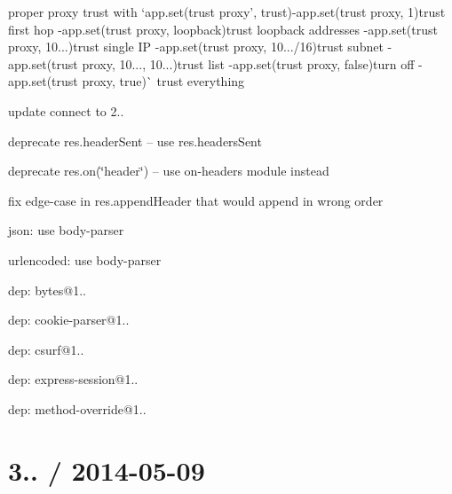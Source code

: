 {\ttfamily 
\begin{DoxyItemize}
\item proper proxy trust with `app.\+set(\textquotesingle{}trust proxy', trust){\ttfamily  -\/}app.\+set(\textquotesingle{}trust proxy\textquotesingle{}, 1){\ttfamily trust first hop -\/}app.\+set(\textquotesingle{}trust proxy\textquotesingle{}, \textquotesingle{}loopback\textquotesingle{}){\ttfamily trust loopback addresses -\/}app.\+set(\textquotesingle{}trust proxy\textquotesingle{}, \textquotesingle{}10...\textquotesingle{}){\ttfamily trust single IP -\/}app.\+set(\textquotesingle{}trust proxy\textquotesingle{}, \textquotesingle{}10.../16\textquotesingle{}){\ttfamily trust subnet -\/}app.\+set(\textquotesingle{}trust proxy\textquotesingle{}, \textquotesingle{}10..., 10...\textquotesingle{}){\ttfamily trust list -\/}app.\+set(\textquotesingle{}trust proxy\textquotesingle{}, false){\ttfamily turn off -\/}app.\+set(\textquotesingle{}trust proxy\textquotesingle{}, true)\`{} trust everything
\item update connect to 2..
\begin{DoxyItemize}
\item deprecate {\ttfamily res.\+header\+Sent} -- use {\ttfamily res.\+headers\+Sent}
\item deprecate {\ttfamily res.\+on(\char`\"{}header\char`\"{})} -- use on-\/headers module instead
\item fix edge-\/case in {\ttfamily res.\+append\+Header} that would append in wrong order
\item json\+: use body-\/parser
\item urlencoded\+: use body-\/parser
\item dep\+: bytes@1..
\item dep\+: cookie-\/parser@1..
\item dep\+: csurf@1..
\item dep\+: express-\/session@1..
\item dep\+: method-\/override@1..
\end{DoxyItemize}
\end{DoxyItemize}}

{\ttfamily \section*{3.. / 2014-\/05-\/09 }}

{\ttfamily }

